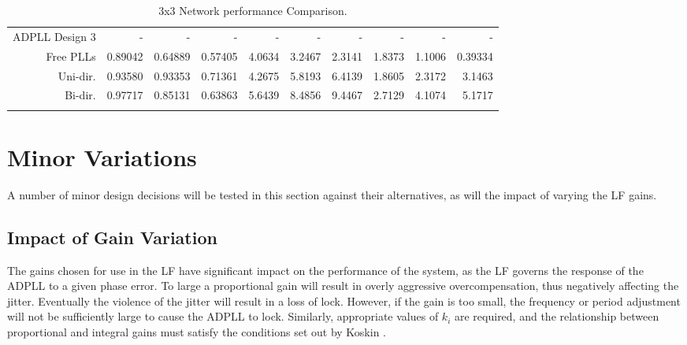 \begin{table}[!ht]
\begin{center}
\begin{footnotesize}
\begin{tabular}{ll|r|r|r|r|r|r|r|r|r|}
                \hline
                \multicolumn{2}{|l|}{\ac{ADPLL} Design 3}&-&-&-&-&-&-&-&-&-\T\\
                \multicolumn{2}{|r|}{Free PLLs} &0.89042 &0.64889 &0.57405    &4.0634 &3.2467 &2.3141    &1.8373&1.1006&0.39334  \T\\
                \multicolumn{2}{|r|}{Uni-dir.}  &0.93580 &0.93353 &0.71361    &4.2675 &5.8193 &6.4139    &1.8605&2.3172&3.1463   \T\\
                \multicolumn{2}{|r|}{Bi-dir.}   &0.97717 &0.85131 &0.63863    &5.6439 &8.4856 &9.4467    &2.7129&4.1074&5.1717   \T\\
                \hline
                \B                
            \end{tabular}
        \end{footnotesize}
        \caption{3x3 Network performance Comparison.}
        \label{table:3x3perf}
    \end{center}
    \vspace{-0.5cm}
\end{table}


\section{Minor Variations}\label{section:minor_variations}
A number of minor design decisions will be tested in this section against their alternatives, as will the impact of varying the \ac{LF} gains.

\subsection{Impact of Gain Variation}
The gains chosen for use in the \acl{LF} have significant impact on the performance of the system, as the \ac{LF} governs the response of the \ac{ADPLL} to a given phase error. To large a proportional gain will result in overly aggressive overcompensation, thus negatively affecting the jitter. Eventually the violence of the jitter will result in a loss of lock. However, if the gain is too small, the frequency or period adjustment will not be sufficiently large to cause the \ac{ADPLL} to lock. Similarly, appropriate values of $k_i$ are required, and the relationship between proportional and integral gains must satisfy the conditions set out by Koskin \cite{koskin2018generation}.

